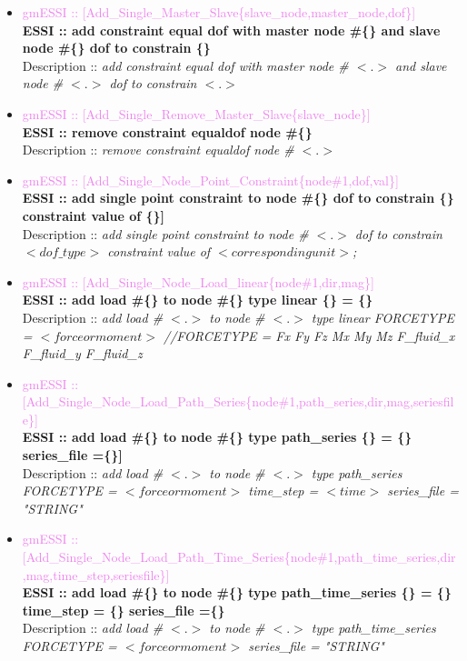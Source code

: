 \documentclass[11pt]{article}
\begin{document}
\begin{itemize}
        \item \textcolor{violet} {gmESSI :: [Add\_Single\_Master\_Slave\{slave\_node,master\_node,dof\}]}\\
        \textbf{ESSI :: add constraint equal dof with master node \#\{\} and slave node \#\{\}  dof to constrain \{\}}\\
        Description :: \textit{add constraint equal dof with master node \# $<.>$ and slave node \# $<.>$ dof to constrain $<.>$}

        \item \textcolor{violet} {gmESSI :: [Add\_Single\_Remove\_Master\_Slave\{slave\_node\}]}\\
        \textbf{ESSI :: remove constraint equaldof node \#\{\}}\\
        Description :: \textit{remove constraint equaldof node \# $<.>$}

        \item \textcolor{violet} {gmESSI :: [Add\_Single\_Node\_Point\_Constraint\{node\#1,dof,val\}]}\\
        \textbf{ESSI :: add single point constraint to node \#\{\}  dof to constrain \{\} constraint value of \{\}]}\\
        Description :: \textit{add single point constraint to node \# $<.>$ dof to constrain $<dof\_type>$ constraint value of $<corresponding unit>$;}

        \item \textcolor{violet} {gmESSI :: [Add\_Single\_Node\_Load\_linear\{node\#1,dir,mag\}]}\\
        \textbf{ESSI :: add load \#\{\} to node \#\{\} type linear \{\} = \{\}}\\
        Description :: \textit{add load \# $<.>$ to node \# $<.>$ type linear FORCETYPE = $<force or moment>$ //FORCETYPE = Fx Fy Fz Mx My Mz F\_fluid\_x F\_fluid\_y F\_fluid\_z}

        \item \textcolor{violet} {gmESSI :: [Add\_Single\_Node\_Load\_Path\_Series\{node\#1,path\_series,dir,mag,seriesfile\}]}\\
        \textbf{ESSI :: add load \#\{\} to node \#\{\} type path\_series \{\} = \{\} series\_file =\{\}]}\\
        Description :: \textit{add load \# $<.>$ to node \# $<.>$ type path\_series FORCETYPE = $<force or moment>$ time\_step = $<time>$ series\_file = "STRING"}

        \item \textcolor{violet} {gmESSI :: [Add\_Single\_Node\_Load\_Path\_Time\_Series\{node\#1,path\_time\_series,dir,mag,time\_step,seriesfile\}]}\\
        \textbf{ESSI :: add load \#\{\} to node \#\{\} type path\_time\_series \{\} = \{\} time\_step = \{\} series\_file =\{\}}\\
        Description :: \textit{add load \# $<.>$ to node \# $<.>$ type path\_time\_series FORCETYPE = $<force or moment>$ series\_file = "STRING"}


\end{itemize}
\end{document}
